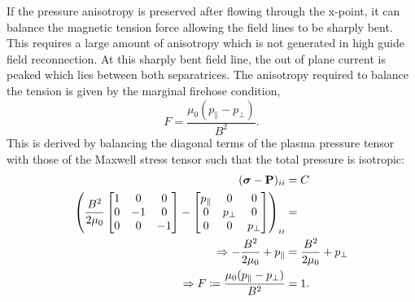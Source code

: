 If the pressure anisotropy is preserved after flowing through the x-point, it can balance the magnetic tension force allowing the field lines to be sharply bent. This requires a large amount of anisotropy which is not generated in high guide field reconnection. At this sharply bent field line, the out of plane current is peaked which lies between both separatrices. The anisotropy required to balance the tension is given by the marginal firehose condition,
\begin{equation}
  F = \frac{\mu_0 (p_\parallel - p_\perp)}{B^2}.
\end{equation}
This is derived by balancing the diagonal terms of the plasma pressure tensor with those of the Maxwell stress tensor such that the total pressure is isotropic:
\begin{align*}
  (\bm{\sigma} - \vb{P})_{ii} &= C \\
  \left(\frac{B^2}{2\mu_0} \begin{bmatrix}
    1 & 0 & 0 \\
    0 & -1 & 0 \\
    0 & 0 & -1 \\
  \end{bmatrix} - \begin{bmatrix}
    p_\parallel & 0 & 0 \\
    0 & p_\perp & 0 \\
    0 & 0 & p_\perp \\
  \end{bmatrix}\right)_{ii} &= \\
  \Rightarrow -\frac{B^2}{2 \mu_0} + p_\parallel &= \frac{B^2}{2 \mu_0} + p_\perp \\
  \Rightarrow F \coloneq \frac{\mu_0 (p_\parallel - p_\perp)}{B^2} &= 1.
\end{align*}





